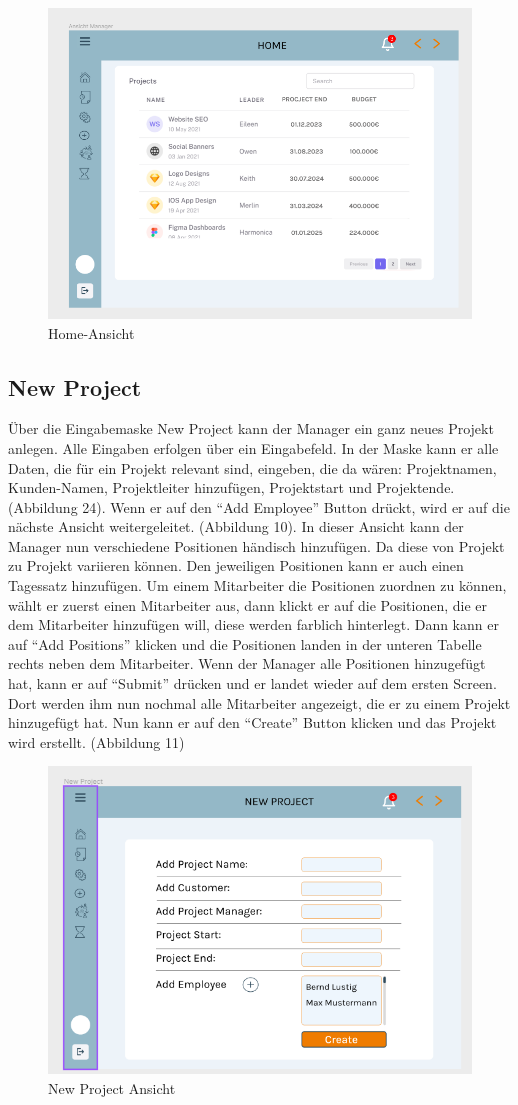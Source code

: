 \documentclass{article}
\begin{document}
\begin{figure}[h]
    \includegraphics[height= 0.5\textwidth,width= \textwidth]{images/Home.png}
    \caption{Home-Ansicht}
    \label{fig:beispiel}
\end{figure}

\newpage
\subsection{New Project}
Über die Eingabemaske New Project kann der Manager ein ganz neues Projekt anlegen. Alle Eingaben erfolgen über ein Eingabefeld. In der Maske kann er alle Daten, die für ein Projekt relevant sind, eingeben, die da wären: Projektnamen, Kunden-Namen, Projektleiter hinzufügen, Projektstart und  Projektende. (Abbildung 24). Wenn er auf den “Add Employee” Button drückt, wird er auf die nächste Ansicht weitergeleitet. (Abbildung 10). In dieser Ansicht kann der Manager nun verschiedene Positionen händisch hinzufügen. Da diese von Projekt zu Projekt variieren können. Den jeweiligen Positionen kann er auch einen Tagessatz hinzufügen. Um einem Mitarbeiter die Positionen zuordnen zu können, wählt er zuerst einen Mitarbeiter aus, dann klickt er auf die Positionen, die er dem Mitarbeiter hinzufügen will, diese werden farblich hinterlegt. Dann kann er auf “Add Positions” klicken und die Positionen landen in der unteren Tabelle rechts neben dem Mitarbeiter. Wenn der Manager alle Positionen hinzugefügt hat, kann er auf “Submit” drücken und er landet wieder auf dem ersten Screen. Dort werden ihm nun nochmal alle Mitarbeiter angezeigt, die er zu einem Projekt hinzugefügt hat. Nun kann er auf den “Create” Button klicken und das Projekt wird erstellt. (Abbildung 11)

\newpage
\begin{figure}[h]
    \includegraphics[height= 0.5\textwidth,width= \textwidth]{images/New Project.png}
    \caption{New Project Ansicht}
    \label{fig:beispiel}
\end{figure}
\end{document}
